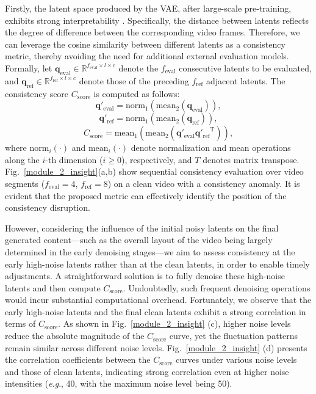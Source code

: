 \documentclass{article}
\theoremstyle{plain}
\theoremstyle{definition}
\theoremstyle{remark}
\newcommand{\eg}{\textit{e}.\textit{g}.}
\begin{document}
Firstly, the latent space produced by the VAE, after large-scale pre-training, exhibits strong interpretability \cite{kingma2013auto}. Specifically, the distance between latents reflects the degree of difference between the corresponding video frames. Therefore, we can leverage the cosine similarity between different latents as a consistency metric, thereby avoiding the need for additional external evaluation models. 
Formally, let $\mathbf{q}_\mathrm{eval} \in \mathbb{R}^{f_\mathrm{eval} \times l \times c}$ denote the $f_\mathrm{eval}$ consecutive latents to be evaluated, and $\mathbf{q}_\mathrm{ref} \in \mathbb{R}^{f_\mathrm{ref} \times l \times c}$ denote those of the preceding $f_\mathrm{ref}$ adjacent latents. The consistency score $C_\mathrm{score}$ is computed as follows:
\begin{equation}
\mathbf{q}'_\mathrm{eval} = \mathrm{norm}_1\left( \mathrm{mean}_2(\mathbf{q}_\mathrm{eval}) \right),
\label{eq:sim_1}
\end{equation}
\begin{equation}
\mathbf{q}'_\mathrm{ref} = \mathrm{norm}_1\left( \mathrm{mean}_2(\mathbf{q}_\mathrm{ref}) \right),
\label{eq:sim_1_1}
\end{equation}
\begin{equation}
C_\mathrm{score} = \mathrm{mean}_1\left( \mathrm{mean}_2\left( \mathbf{q}'_\mathrm{eval} {\mathbf{q}'_\mathrm{ref}}^\mathrm{T}\right) \right),
\label{eq:sim_2}
\end{equation}
where $\mathrm{norm}_i(\cdot)$ and $\mathrm{mean}_i(\cdot)$ denote normalization and mean operations along the $i$-th dimension ($i \geq 0$), respectively, and $T$ denotes matrix transpose.  
Fig.~\ref{module_2_insight}(a,b) show sequential consistency evaluation over video segments ($f_\mathrm{eval}=4$, $f_\mathrm{ref}=8$) on a clean video with a consistency anomaly. 
It is evident that the proposed metric can effectively identify the position of the consistency disruption.

However, considering the influence of the initial noisy latents \cite{qiu2023freenoise} on the final generated content—such as the overall layout of the video being largely determined in the early denoising stages—we aim to assess consistency at the early high-noise latents rather than at the clean latents, in order to enable timely adjustments. 
A straightforward solution is to fully denoise these high-noise latents and then compute  $C_\mathrm{score}$.
Undoubtedly, such frequent denoising operations would incur substantial computational overhead.
Fortunately, we observe that the early high-noise latents and the final clean latents exhibit a strong correlation in terms of  $C_\mathrm{score}$.
As shown in Fig.~\ref{module_2_insight} (c), higher noise levels reduce the absolute magnitude of the $C_\mathrm{score}$ curve, yet the fluctuation patterns remain similar across different noise levels. Fig.~\ref{module_2_insight} (d) presents the correlation coefficients between the $C_\mathrm{score}$ curves under various noise levels and those of clean latents, indicating strong correlation even at higher noise intensities (\eg, 40, with the maximum noise 
level being 50).
\end{document}
